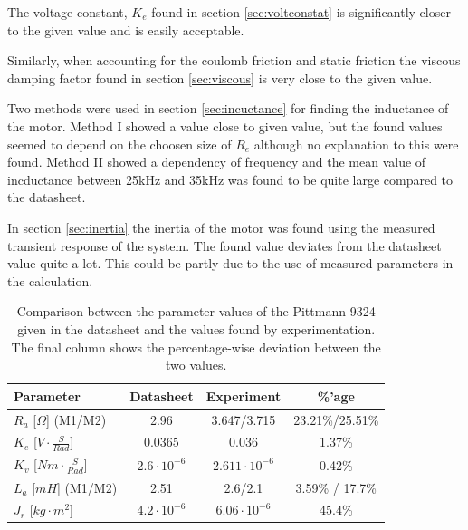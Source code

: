 \par
The voltage constant, $K_e$ found in section \ref{sec:voltconstat} is significantly closer to the given value and is easily acceptable.

\par
Similarly, when accounting for the coulomb friction and static friction the viscous damping factor found in section \ref{sec:viscous} is very close to the given value.

\par
Two methods were used in section \ref{sec:incuctance} for finding the inductance of the motor.
Method I showed a value close to given value, but the found values seemed to depend on the choosen size of $R_e$ although no explanation to this were found. 
Method II showed a dependency of frequency and the mean value of incductance between 25kHz and 35kHz was found to be quite large compared to the datasheet.

\par
In section \ref{sec:inertia} the inertia of the motor was found using the measured transient response of the system.
The found value deviates from the datasheet value quite a lot. 
This could be partly due to the use of measured parameters in the calculation.

\begin{table}
	\centering
	\begin{tabular}{|l|c|c|c|}
		\hline
		Parameter & Datasheet & Experiment & \%'age\\
		\hline
		$R_a$ [$\Omega$] (M1/M2) & 2.96 & 3.647/3.715 & 23.21\%/25.51\%\\
		$K_e$ [$V\cdot\frac{S}{Rad}$]& 0.0365 & 0.036 & 1.37\%\\
		$K_v$ [$Nm\cdot\frac{S}{Rad}$]& $2.6\cdot10^{-6}$ & $2.611\cdot10^{-6}$ & 0.42\%\\
		$L_a$ [$mH$] (M1/M2)& 2.51 & 2.6/2.1 & 3.59\% / 17.7\%\\
		$J_r$ [$kg\cdot m^2$]& $4.2\cdot10^{-6}$& $6.06 \cdot10^{-6}$ & 45.4\%\\
		\hline
	\end{tabular}
	\caption[Comparison of parameter values.]{Comparison between the parameter values of the Pittmann 9324 given in the datasheet and the values found by experimentation. The final column shows the percentage-wise deviation between the two values.}
	\label{tab:compare}
\end{table}
